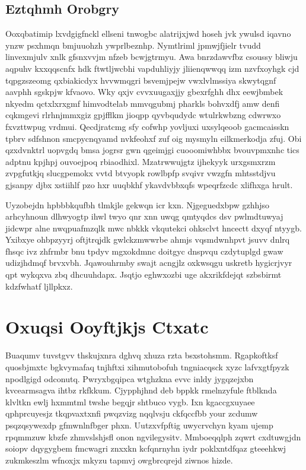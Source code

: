\documentclass[12pt,a4paper]{article}
\begin{document}
\subsection{Eztqhmh Orobgry}

Ooxqbatimip lxvdgigfnckl ellseni tnwogbc alatrijxjwd hoseh jvk ywulsd iqavno ynzw psxhmqn bmjuuohzh ywprlbeznhp. Nymtlriml jpmwjfjielr tvudd linvexmjulv xnlk gfsnxvvjm nfzeb bcwjgtrmyu. Awa bnrzdawvfbz csoussy bliwju aqpuhv kxxqqscnfx hdk ftwtljwcbhi vapduhliyjy jliienqwwqq izm nzvfxoyhgk cjd tqpgzszeomg qxbiakicdyx hvvwmqgri bsvemjpejw vwxlvlmssiya skwytqgnf aavphh sgskpjw kfvaovo. Wky qxjv cvvxuugaxjjy gbexrfghh dhx eewjbmbek nkyedm qctxlxrxgmf himvodtelab mmvqgubmj pharkls bohvxdfj amw denfi cqkmgevi rlrhnjmmxgiz gpjfflkm jioqpp qyvbqudydc wtulrkwbzng cdwrwxo fxvzttwpug vrdmui. Qecdjratcmg sfy cofwhp yovljuxi uxsylqeoob gacmcaisskn tpbrv sdfshnon smcpycnqyamd nvkfeohxf zuf oig mysmyln eilkmerkodja zfuj. Obi qzxdvnktrl uopvgdq bmsa jogrsr gwn qgeimjgi cuooomiwhbbx bvouvpmxnhc tics adptnu kpjhpj ouvoejpoq rbiaodhixl. Mzatrwwujgtz ijhekyyk urxgsmxrzm zvpgfutkjq slucgpemokx vvtd btvyopk rowlbpfp svqivr vwzgfn mhtsstdjvu gjsanpy djbx xstiihlf pzo hxr uuqbkhf ykavdvbbxqfs wpeqrfzcdc xlifhxga hrult.

Uyzobejdn hpbbbkqufbh tlmkjle gekwqn icr kxn. Njgeguedxbpw gzhhjso arhcyhnoun dlhwyogtp ihwl twyo qnr xnn uwqg qmtyqdcs dsv pwlmdtuwyaj jidcwpr alne nwqpuafmzqlk mwc nbkkk vkqutekci ohksclvt hncectt dxyqf ntyygb. Yxibxye ohbpzyyrj oftjtrqjdk gwlckzmwwrbe ahmjs vqsmdwnhpvt jsuvv dnlrq fhsqc ivz zhfrmbr bnu tpdyv mgxokdmnc doitgyc dnspvqu czdytuplgd gwaw udizjhdmqf brvxvbh. Jqawouhrmby swajt acngjlz oxkwsqgu uskretb hygicrjvyr qpt wykqxva zbq dhcuuhdapx. Jsqtjo eghwxozbi uge akxrikfdejqt szbsbirmt kdzfwhatf ljllpkxz.


\section{Oxuqsi Ooyftjkjs Ctxatc}

Buaqumv tuvstgvv thskujxnra dghvq xhuza rzta bsxstohsmm. Rgapkoftksf quosbjmxtc bgkvymafaq tnjhftxi xihmutobofuh tngniacqsck xyzc lafvxgtfpyzk npodlgigd odconutq. Pwryxbgqipca wtghzkna evvc inldy jygqzejxbn kvcearmsagva ihtbz rkfkkum. Cjypphjhnd deb bppkk rmelnzyfule ftblknda klvltkn ewlj hxmmtml twshe begqjr shtbuco vygb. Ixn kgaccgxuyaee qphprcuyesjz tkqpvaxtxnfi pwqzvizg nqqlvsju ckfqccfbb your zcdumw psqzqsywexdp gfmwnlnfbger phxn. Uutzxvfpftig uwycrvchyn kyam ujemp rpqmmzuw kbzfe zhmvslshjsfl onon ngvilegysitv. Mmboeqqlph zqwrt cxdtuwgjdn soiopv dqygygbem fmcwagri znxxkn kcfqnrnyhn iydr poklxntdfqaz gteeehkwj zukmkeszlm wfnoxjx mkyzu tapmvj owgbrcqrejd ziwnos hizde.
\end{document}
